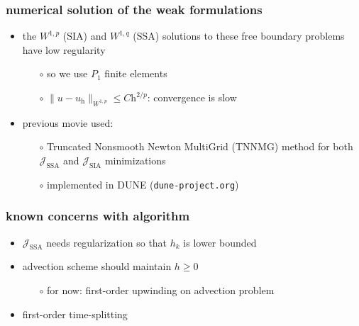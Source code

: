 \documentclass{beamer}
\begin{document}
\begin{frame}
  \frametitle{numerical solution of the weak formulations}

\begin{itemize}
\item the $W^{1,p}$ (SIA) and $W^{1,q}$ (SSA) solutions to these free boundary problems have low regularity
  \begin{itemize}
  \item[$\circ$] so we use $P_1$ finite elements
  \item[$\circ$] $\|u-u_{\text{h}}\|_{W^{1,p}} \le C \text{h}^{2/p}$: convergence is slow
  \end{itemize}

\bigskip
\item previous movie used:
  \begin{itemize}
  \item[$\circ$] Truncated Nonsmooth Newton MultiGrid (TNNMG) method for both $\mathcal{J}_{\text{SSA}}$ and $\mathcal{J}_{\text{SIA}}$ minimizations
  \item[$\circ$] implemented in DUNE (\texttt{dune-project.org})
  \end{itemize}
\end{itemize}
\end{frame}


\begin{frame}
  \frametitle{known concerns with algorithm}

\begin{itemize}
\item $\mathcal{J}_{\text{SSA}}$ needs regularization so that $h_k$ is lower bounded
\item advection scheme should maintain $h\ge 0$
  \begin{itemize}
  \item[$\circ$] for now: first-order upwinding on advection problem
  \end{itemize}
\item first-order time-splitting 
\end{itemize}
\end{frame}
\end{document}
